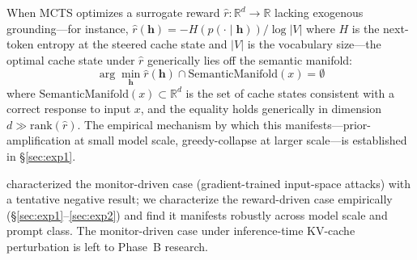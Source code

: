 \begin{hypothesis}\label{hyp:goodhart}
When MCTS optimizes a surrogate reward $\hat{r}: \mathbb{R}^d \to \mathbb{R}$ lacking exogenous grounding---for instance, $\hat{r}(\mathbf{h}) = -H(p(\cdot \mid \mathbf{h}))/\log|V|$ where $H$ is the next-token entropy at the steered cache state and $|V|$ is the vocabulary size---the optimal cache state under $\hat{r}$ generically lies off the semantic manifold:
\begin{equation}
\arg\min_{\mathbf{h}} \hat{r}(\mathbf{h}) \cap \text{SemanticManifold}(x) = \emptyset
\label{eq:goodhart}
\end{equation}
where $\text{SemanticManifold}(x) \subset \mathbb{R}^d$ is the set of cache states consistent with a correct response to input $x$, and the equality holds generically in dimension $d \gg \text{rank}(\hat{r})$. The empirical mechanism by which this manifests---prior-amplification at small model scale, greedy-collapse at larger scale---is established in §\ref{sec:exp1}.
\end{hypothesis}

\citet{bailey2024obfuscated} characterized the monitor-driven case (gradient-trained input-space attacks) with a tentative negative result; we characterize the reward-driven case empirically (§\ref{sec:exp1}--\ref{sec:exp2}) and find it manifests robustly across model scale and prompt class. The monitor-driven case under inference-time KV-cache perturbation is left to Phase~B research.

